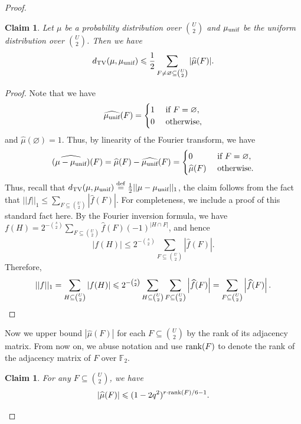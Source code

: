 \documentclass[reqno]{amsart}
\newtheorem{claim}[theorem]{Claim}
\theoremstyle{definition}
\numberwithin{theorem}{section}
\renewcommand{\leq}{\le}
\def\eqdef{\overset{\rm{def}}{=}}
\renewcommand{\le}{\leqslant}
\newcommand{\abs}[1]{\left|#1\right|}
\newcommand{\F}{\mathbb{F}}
\newcommand{\rank}{\textup{rank}}
\begin{document}
\begin{proof}
    \begin{claim}\label{claim:Fourier}
        Let $\mu$ be a probability distribution over $\binom{U}{2}$ and $\mu_{\textup{unif}}$ be the uniform distribution over $\binom{U}{2}$. Then we have
        \[d_{\textup{TV}}(\mu,\mu_{\textup{unif}})\le \frac{1}{2}\sum_{F\ne\varnothing\subseteq \binom{U}{2}}|\widehat{\mu}(F)|.\]
    \end{claim}
    \begin{proof}
        Note that we have 
        \[\widehat{\mu_{\textup{unif}}}(F)=\begin{cases}
            1&\text{ if }F=\varnothing,\\
            0&\text{ otherwise},
        \end{cases}\]
        and $\widehat{\mu}(\varnothing)=1$. Thus, by linearity of the Fourier transform, we have
        \[\widehat{(\mu-\mu_{\textup{unif}})}(F) = \widehat{\mu}(F) - \widehat{\mu_{\textup{unif}}}(F)=\begin{cases}
            0&\text{ if }F=\varnothing,\\
            \widehat{\mu}(F)&\text{ otherwise}.
        \end{cases}\]
        Thus, recall that $d_{\textup{TV}}(\mu,\mu_{\textup{unif}})\eqdef\frac{1}{2}||\mu-\mu_{\textup{unif}}||_1$, the claim follows from the fact that $||f||_1\leq \sum_{F\subseteq\binom{U}{2}}\abs{\widehat{f}(F)}$. For completeness, we include a proof of this standard fact here. By the Fourier inversion formula, we have $f(H)=2^{-\binom{s}{2}}\sum_{F\subseteq\binom{U}{2}}\widehat{f}(F)(-1)^{\abs{H\cap F}}$, and hence
        \[\abs{f(H)}\leq 2^{-\binom{s}{2}}\sum_{F\subseteq\binom{U}{2}}\abs{\widehat{f}(F)}.\]
        Therefore, 
        \[||f||_1=\sum_{H\subseteq\binom{U}{2}}\abs{f(H)}\leq 2^{-\binom{s}{2}}\sum_{H\subseteq\binom{U}{2}}\sum_{F\subseteq\binom{U}{2}}\abs{\widehat{f}(F)}=\sum_{F\subseteq\binom{U}{2}}\abs{\widehat{f}(F)}.\qedhere\]
    \end{proof}
    
    Now we upper bound $\abs{\widehat{\mu}(F)}$ for each $F\subseteq \binom{U}{2}$ by the rank of its adjacency matrix. From now on, we abuse notation and use $\rank(F)$ to denote the rank of the adjacency matrix of $F$ over $\F_2$.
    
    \begin{claim}\label{claim:Fourier_bound}
        For any $F\subseteq \binom{U}{2}$, we have 
        \[\abs{\widehat{\mu}(F)}\leq (1-2q^2)^{r\cdot\rank(F)/6-1}.\]
    \end{claim}
    

\end{proof}
\end{document}
